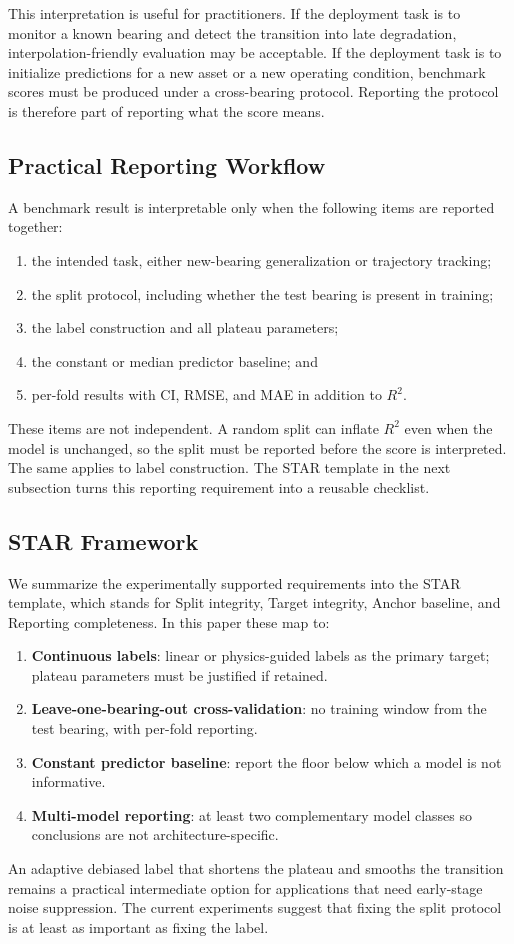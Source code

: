 \documentclass[5p,twocolumn]{elsarticle}
\begin{document}
This interpretation is useful for practitioners. If the deployment task is to monitor a known bearing and detect the transition into late degradation, interpolation-friendly evaluation may be acceptable. If the deployment task is to initialize predictions for a new asset or a new operating condition, benchmark scores must be produced under a cross-bearing protocol. Reporting the protocol is therefore part of reporting what the score means.

\subsection{Practical Reporting Workflow}
A benchmark result is interpretable only when the following items are reported together:
\begin{enumerate}
    \item the intended task, either new-bearing generalization or trajectory tracking;
    \item the split protocol, including whether the test bearing is present in training;
    \item the label construction and all plateau parameters;
    \item the constant or median predictor baseline; and
    \item per-fold results with CI, RMSE, and MAE in addition to $R^2$.
\end{enumerate}
These items are not independent. A random split can inflate $R^2$ even when the model is unchanged, so the split must be reported before the score is interpreted. The same applies to label construction. The STAR template in the next subsection turns this reporting requirement into a reusable checklist.

\subsection{STAR Framework}
We summarize the experimentally supported requirements into the STAR template, which stands for Split integrity, Target integrity, Anchor baseline, and Reporting completeness. In this paper these map to:
\begin{enumerate}
    \item \textbf{Continuous labels}: linear or physics-guided labels as the primary target; plateau parameters must be justified if retained.
    \item \textbf{Leave-one-bearing-out cross-validation}: no training window from the test bearing, with per-fold reporting.
    \item \textbf{Constant predictor baseline}: report the floor below which a model is not informative.
    \item \textbf{Multi-model reporting}: at least two complementary model classes so conclusions are not architecture-specific.
\end{enumerate}
An adaptive debiased label that shortens the plateau and smooths the transition remains a practical intermediate option for applications that need early-stage noise suppression. The current experiments suggest that fixing the split protocol is at least as important as fixing the label.
\end{document}
